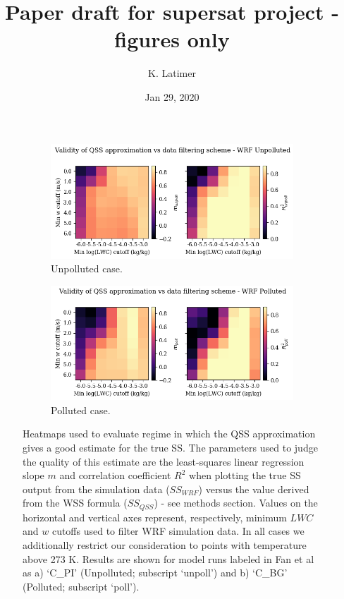 \documentclass{article}
\title{Paper draft for supersat project - figures only}
\author{K. Latimer}
\date{Jan 29, 2020}
\begin{document}
\maketitle

\begin{figure}[ht]
	\centering
	\begin{subfigure}{1\textwidth}
		\includegraphics[width=\textwidth]{revmywrf/v1_FINAL_from_data_regres_param_heatmaps_Unpolluted_figure.png}
		\caption{Unpolluted case.}
		\label{regresheatmapunpoll}
	\end{subfigure}
	\begin{subfigure}{1\textwidth}
		\includegraphics[width=\textwidth]{revmywrf/v1_FINAL_from_data_regres_param_heatmaps_Polluted_figure.png}
		\caption{Polluted case.}
		\label{regresheatmappoll}
	\end{subfigure}
	\caption{Heatmaps used to evaluate regime in which the QSS approximation gives a good estimate for the true SS. The parameters used to judge the quality of this estimate are the least-squares linear regression slope $m$ and correlation coefficient $R^2$ when plotting the true SS output from the simulation data ($SS_{WRF}$) versus the value derived from the WSS formula ($SS_{QSS}$) - see methods section. Values on the horizontal and vertical axes represent, respectively, minimum $LWC$ and $w$ cutoffs used to filter WRF simulation data. In all cases we additionally restrict our consideration to points with temperature above 273 K. Results are shown for model runs labeled in Fan et al as a) `C\_PI' (Unpolluted; subscript `unpoll') and b) `C\_BG' (Polluted; subscript `poll').}
	\label{regresheatmap}
\end{figure}
\end{document}
